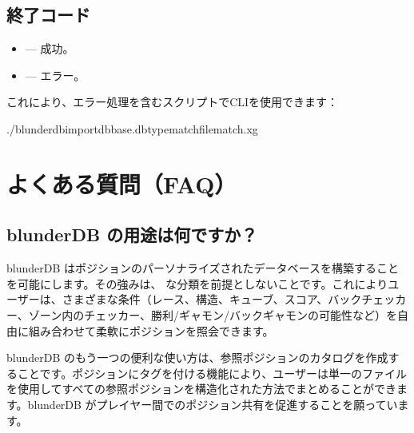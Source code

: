 \documentclass[letterpaper,10pt,dvipdfmx]{sphinxmanual}
\begin{document}
\subsection{終了コード}
\label{\detokenize{cli:codes-de-retour}}\begin{itemize}
\item {} 
\sphinxAtStartPar
{} — 成功。

\item {} 
\sphinxAtStartPar
{} — エラー。

\end{itemize}

\sphinxAtStartPar
これにより、エラー処理を含むスクリプトでCLIを使用できます：

\begin{sphinxVerbatim}[commandchars=\\\{\}]
./blunderdbimport\PYGZhy{}\PYGZhy{}dbbase.db\PYGZhy{}\PYGZhy{}typematch\PYGZhy{}\PYGZhy{}filematch.xg
\end{sphinxVerbatim}

\sphinxstepscope


\section{よくある質問（FAQ）}
\label{\detokenize{faq:foire-aux-questions}}\label{\detokenize{faq:faq}}\label{\detokenize{faq::doc}}

\subsection{blunderDB の用途は何ですか？}
\label{\detokenize{faq:quel-est-l-utilite-de-blunderdb}}
\sphinxAtStartPar
blunderDB はポジションのパーソナライズされたデータベースを構築することを可能にします。その強みは、 な分類を前提としないことです。これによりユーザーは、さまざまな条件（レース、構造、キューブ、スコア、バックチェッカー、ゾーン内のチェッカー、勝利/ギャモン/バックギャモンの可能性など）を自由に組み合わせて柔軟にポジションを照会できます。

\sphinxAtStartPar
blunderDB のもう一つの便利な使い方は、参照ポジションのカタログを作成することです。ポジションにタグを付ける機能により、ユーザーは単一のファイルを使用してすべての参照ポジションを構造化された方法でまとめることができます。blunderDB がプレイヤー間でのポジション共有を促進することを願っています。
\end{document}

